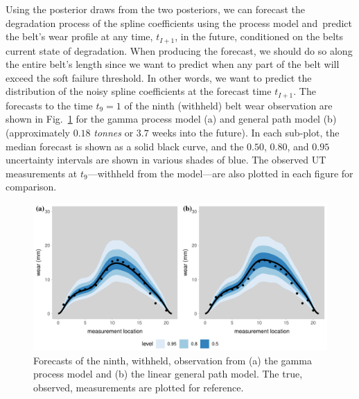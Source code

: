 Using the posterior draws from the two posteriors, we can forecast the degradation process of the spline coefficients using the process model and predict the belt's wear profile at any time, $t_{I+1}$, in the future, conditioned on the belts current state of degradation. When producing the forecast, we should do so along the entire belt's length since we want to predict when any part of the belt will exceed the soft failure threshold. In other words, we want to predict the distribution of the noisy spline coefficients at the forecast time $t_{I + 1}$. The forecasts to the time $t_9 = 1$ of the ninth (withheld) belt wear observation are shown in Fig.~\ref{fig:beltwear-forecasts} for the gamma process model (a) and general path model (b) (approximately $0.18$ \textit{tonnes} or $3.7$ weeks into the future). In each sub-plot, the median forecast is shown as a solid black curve, and the $0.50$, $0.80$, and $0.95$ uncertainty intervals are shown in various shades of blue. The observed UT measurements at $t_9$---withheld from the model---are also plotted in each figure for comparison.

\begin{figure}
  \centering
  \includegraphics[width=\textwidth]{figures/ch-6/belt_wear_forecasts.pdf}
  \caption{Forecasts of the ninth, withheld, observation from (a) the gamma process model and (b) the linear general path model. The true, observed, measurements are plotted for reference.}
  \label{fig:beltwear-forecasts}
\end{figure}

